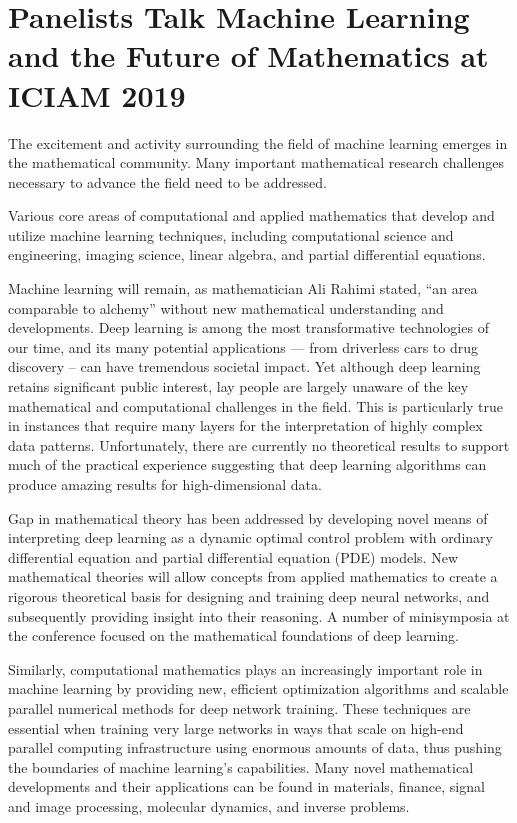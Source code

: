 

\section{Panelists Talk Machine Learning and the Future of Mathematics at ICIAM 2019}
The excitement and activity surrounding the field of machine learning emerges in the mathematical community. 
Many important mathematical research challenges necessary to advance the field need to be addressed. 

Various core areas of computational and applied mathematics that develop and utilize machine learning techniques, including computational science and engineering, imaging science, linear algebra, and partial differential equations.

Machine learning will remain, as mathematician Ali Rahimi stated, ``an area comparable to alchemy'' without new mathematical understanding and developments. Deep learning is among the most transformative technologies of our time, and its many potential applications --- from driverless cars to drug discovery -- can have tremendous societal impact. Yet although deep learning retains significant public interest, lay people are largely unaware of the key mathematical and computational challenges in the field. This is particularly true in instances that require many layers for the interpretation of highly complex data patterns. Unfortunately, there are currently no theoretical results to support much of the practical experience suggesting that deep learning algorithms can produce amazing results for high-dimensional data.

Gap in mathematical theory has been addressed by developing novel means of interpreting deep learning as a dynamic optimal control problem with ordinary differential equation and partial differential equation (PDE) models. New mathematical theories will allow concepts from applied mathematics to create a rigorous theoretical basis for designing and training deep neural networks, and subsequently providing insight into their reasoning. A number of minisymposia at the conference focused on the mathematical foundations of deep learning.

Similarly, computational mathematics plays an increasingly important role in machine learning by providing new, efficient optimization algorithms and scalable parallel numerical methods for deep network training. These techniques are essential when training very large networks in ways that scale on high-end parallel computing infrastructure using enormous amounts of data, thus pushing the boundaries of machine learning's capabilities.  Many novel mathematical developments and their applications can be found in materials, finance, signal and image processing, molecular dynamics, and inverse problems.

